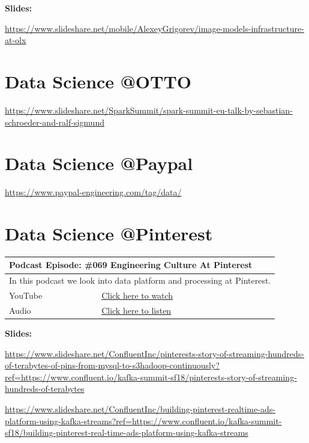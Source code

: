 \documentclass[12pt, numbers=noenddot]{scrreprt} %
\begin{document}
\textbf{Slides:}

\url{https://www.slideshare.net/mobile/AlexeyGrigorev/image-models-infrastructure-at-olx}




\section{Data Science @OTTO}
\url{https://www.slideshare.net/SparkSummit/spark-summit-eu-talk-by-sebastian-schroeder-and-ralf-sigmund}

\section{Data Science @Paypal}
\url{https://www.paypal-engineering.com/tag/data/}

\section{Data Science @Pinterest}

\begin{table}[h]
\begin{tabular}{ll}
\hline
\multicolumn{2}{l}{\textbf{Podcast Episode:} \#069 Engineering Culture At Pinterest} \\ \hline
\multicolumn{2}{p{15cm}}{In this podcast we look into data platform and processing at Pinterest. }         \\ \hline
\multicolumn{1}{l|}{YouTube}   & \href{https://youtu.be/cqWXGVoDX8Q}{Click here to watch}   \\ 
\multicolumn{1}{l|}{Audio}     & \href{https://anchor.fm/andreaskayy/episodes/069-Data-Engineering-At-Pinterest-Case-Study-e45ioh}{Click here to listen}   \\ \hline
\end{tabular}
\end{table}

\textbf{Slides:}

\url{https://www.slideshare.net/ConfluentInc/pinterests-story-of-streaming-hundreds-of-terabytes-of-pins-from-mysql-to-s3hadoop-continuously?ref=https://www.confluent.io/kafka-summit-sf18/pinterests-story-of-streaming-hundreds-of-terabytes} 

\url{https://www.slideshare.net/ConfluentInc/building-pinterest-realtime-ads-platform-using-kafka-streams?ref=https://www.confluent.io/kafka-summit-sf18/building-pinterest-real-time-ads-platform-using-kafka-streams}
\end{document}
